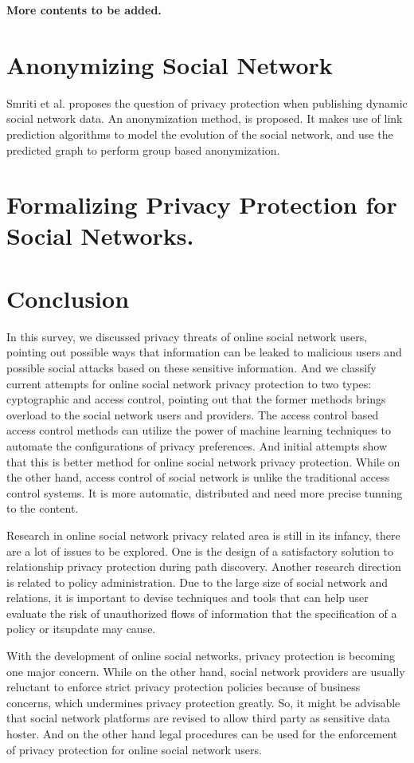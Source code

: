 \documentclass[12pt]{article}
\begin{document}
%  
\textbf{More contents to be added.}

\section{Anonymizing Social Network\label{sec:anony}}
Smriti et al.\cite{dynamic-social-network} proposes the question of
privacy protection when publishing dynamic social network data. An
anonymization method, is proposed. It makes use of link prediction
algorithms to model the evolution of the social network, and use the
predicted graph to perform group based anonymization. 

\section{Formalizing Privacy Protection for Social Networks.}

\section{Conclusion \label{sec:summary}}
In this survey, we discussed privacy threats of online social network
users, pointing out possible ways that information can be leaked to
malicious users and possible social attacks based on these sensitive
information. And we classify current attempts for online social
network privacy protection to two types: cyptographic and access
control, pointing out that the former methods brings overload to the
social network users and providers. The access control based access
control methods can utilize the power of machine learning techniques
to automate the configurations of privacy preferences. And initial
attempts show that this is better method for online social network
privacy protection. While on the other hand, access control of social
network is unlike the traditional access control systems. It is more
automatic, distributed and need more precise tunning to the content. 

Research in online social network privacy related area is still in its
infancy, there are a lot of issues to be explored. One is the design
of a satisfactory solution to relationship privacy protection during
path discovery. Another research direction is related to policy
administration. Due to the large size of social network and relations,
it is important to devise techniques and tools that can help user
evaluate the risk of unauthorized flows of information that the
specification of a policy or itsupdate may cause.

With the development of online social networks, privacy protection is
becoming one major concern. While on the other hand, social network
providers are usually reluctant to enforce strict privacy protection
policies because of business concerns, which undermines privacy
protection greatly. So, it might be advisable that social network
platforms are revised to allow third party as sensitive data
hoster. And on the other hand legal procedures can be used for the
enforcement of privacy protection for online social network users. 



\end{document}

